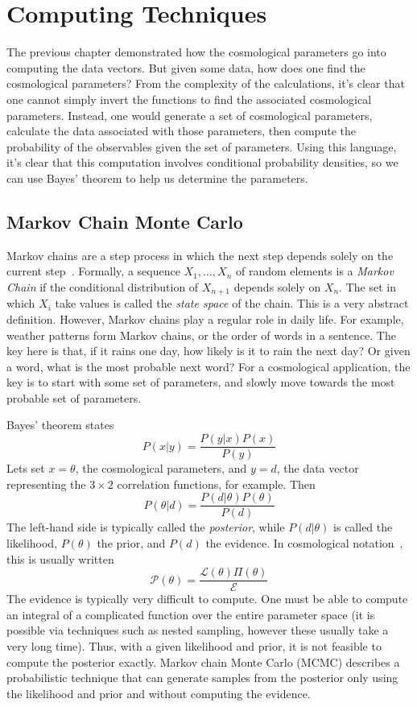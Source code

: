 \chapter{Computing Techniques}
The previous chapter demonstrated how the cosmological parameters go into computing the data vectors. But given some data, how does one find the cosmological parameters? From the complexity of the calculations, it's clear that one cannot simply invert the functions to find the associated cosmological parameters. Instead, one would generate a set of cosmological parameters, calculate the data associated with those parameters, then compute the probability of the observables given the set of parameters. Using this language, it's clear that this computation involves conditional probability densities, so we can use Bayes' theorem to help us determine the parameters.

\section{Markov Chain Monte Carlo}
Markov chains are a step process in which the next step depends solely on the current step~\cite{agrahari_monte_2021}. Formally, a
sequence $X_1,\hdots,X_n$ of random elements is a \textit{Markov Chain} if the conditional distribution  of $X_{n+1}$ depends solely on $X_n$. The set in which $X_i$ take values is called the \textit{state space} of the chain. This is a very abstract definition. However, Markov chains play a regular role in daily life. For example, weather patterns form Markov chains, or the order of words in a sentence. The key here is that, if it rains one day, how likely is it to rain the next day? Or given a word, what is the most probable next word? For a cosmological application, the key is to start with some set of parameters, and slowly move towards the most probable set of parameters.

Bayes' theorem states
\begin{equation}
	P(x|y) = \frac{P(y|x) P(x)}{P(y)}
\end{equation}
Lets set $x=\theta$, the cosmological parameters, and $y=d$, the data vector representing the $3\times 2$ correlation functions, for example. Then
\begin{equation}
	P(\theta|d) = \frac{P(d|\theta) P(\theta)}{P(d)}
\end{equation}
The left-hand side is typically called the \textit{posterior}, while $P(d|\theta)$ is called the likelihood, $P(\theta)$ the prior, and $P(d)$ the evidence. In cosmological notation~\cite{raveri_non-gaussian_2021}, this is usually written
\begin{equation}
	\mathcal{P}(\theta) = \frac{\mathcal{L}(\theta) \Pi(\theta)}{\mathcal{E}}
\end{equation}
The evidence is typically very difficult to compute. One must be able to compute an integral of a complicated function over the entire parameter space (it is possible via techniques such as nested sampling, however these usually take a very long time). Thus, with a given likelihood and prior, it is not feasible to compute the posterior exactly. Markov chain Monte Carlo (MCMC) describes a probabilistic technique that can generate samples from the posterior only using the likelihood and prior and without computing the evidence.
